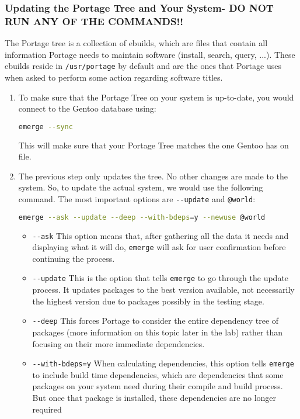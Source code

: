\documentclass[11pt]{article}
\begin{document}
  \subsubsection*{Updating the Portage Tree and Your System- DO NOT RUN ANY OF THE COMMANDS!!}
    The Portage tree is a collection of ebuilds, which are files that contain all information Portage needs to maintain software (install, search, query, ...). These ebuilds reside in \verb|/usr/portage| by default and are the ones that Portage uses when asked to perform some action regarding software titles.
   \begin{enumerate}
     \item To make sure that the Portage Tree on your system is up-to-date, you would connect to the Gentoo database using:
     \begin{lstlisting}[basicstyle=\ttfamily, backgroundcolor = \color{lightgray}, language = bash, xleftmargin = 0cm, framexleftmargin = 1em, showstringspaces=false]
emerge --sync
\end{lstlisting}
     This will make sure that your Portage Tree matches the one Gentoo has on file.
     \item The previous step only updates the tree. No other changes are made to the system. So, to update the actual system, we would use the following command. The most important options are \verb|--update| and \verb|@world|:
     \begin{lstlisting}[basicstyle=\ttfamily, backgroundcolor = \color{lightgray}, language = bash, xleftmargin = 0cm, framexleftmargin = 1em, framexrightmargin = 1em, showstringspaces=false]
emerge --ask --update --deep --with-bdeps=y --newuse @world
\end{lstlisting}
     \begin{itemize}
       \item \verb|--ask| This option means that, after gathering all the data it needs and displaying what it will do, \verb|emerge| will ask for user confirmation before continuing the process. 
       \item \verb|--update| This is the option that tells \verb|emerge| to go through the update process. It updates packages to the best version available, not necessarily the highest version due to packages possibly in the testing stage.
       \item \verb|--deep| This forces Portage to consider the entire dependency tree of packages (more information on this topic later in the lab) rather than focusing on their more immediate dependencies.
       \item \verb|--with-bdeps=y| When calculating dependencies, this option tells \verb|emerge| to include build time dependencies, which are dependencies that some packages on your system need during their compile and build process. But once that package is installed, these dependencies are no longer required

\end{itemize}
\end{enumerate}
\end{document}

